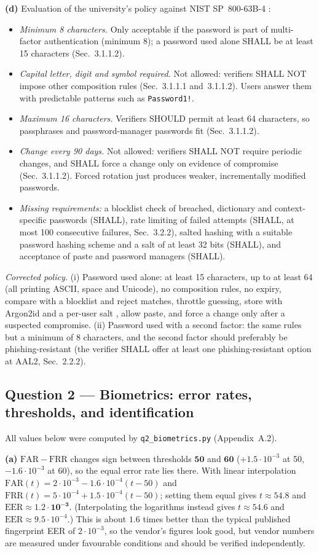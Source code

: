 \documentclass[11pt,a4paper]{article}
\begin{document}
\textbf{(d)} Evaluation of the university's policy against NIST SP~800-63B-4 \cite{nist63b4}:
\begin{itemize}
\item \emph{Minimum 8 characters.} Only acceptable if the password is part of multi-factor authentication
(minimum 8); a password used alone SHALL be at least 15 characters (Sec.~3.1.1.2).
\item \emph{Capital letter, digit and symbol required.} Not allowed: verifiers SHALL NOT impose other
composition rules (Sec.~3.1.1.1 and~3.1.1.2). Users answer them with predictable patterns such as
\texttt{Password1!}.
\item \emph{Maximum 16 characters.} Verifiers SHOULD permit at least 64 characters, so passphrases and
password-manager passwords fit (Sec.~3.1.1.2).
\item \emph{Change every 90 days.} Not allowed: verifiers SHALL NOT require periodic changes, and SHALL force a change
only on evidence of compromise (Sec.~3.1.1.2). Forced rotation just produces weaker, incrementally modified
passwords.
\item \emph{Missing requirements:} a blocklist check of breached, dictionary and context-specific passwords
(SHALL), rate limiting of failed attempts (SHALL, at most 100 consecutive failures, Sec.~3.2.2), salted
hashing with a suitable password hashing scheme and a salt of at least 32 bits (SHALL), and acceptance of paste and
password managers (SHALL).
\end{itemize}
\emph{Corrected policy.} (i) Password used alone: at least 15 characters, up to at least 64 (all printing ASCII,
space and Unicode), no composition rules, no expiry, compare with a blocklist and reject matches, throttle
guessing, store with Argon2id and a per-user salt \cite{owasp}, allow paste, and force a change only after
a suspected compromise. (ii) Password used with a second factor: the same rules but a minimum of 8
characters, and the second factor should preferably be phishing-resistant (the verifier SHALL offer at least
one phishing-resistant option at AAL2, Sec.~2.2.2).

\subsection*{Question 2 --- Biometrics: error rates, thresholds, and identification}
All values below were computed by \texttt{q2\_biometrics.py} (Appendix~A.2).

\textbf{(a)} $\mathrm{FAR}-\mathrm{FRR}$ changes sign between thresholds $\mathbf{50}$ and $\mathbf{60}$
($+1.5\cdot10^{-3}$ at 50, $-1.6\cdot10^{-3}$ at 60), so the equal error rate lies there. With linear
interpolation $\mathrm{FAR}(t)=2\cdot10^{-3}-1.6\cdot10^{-4}(t-50)$ and
$\mathrm{FRR}(t)=5\cdot10^{-4}+1.5\cdot10^{-4}(t-50)$; setting them equal gives $t\approx 54.8$ and
$\mathrm{EER}\approx \mathbf{1.2\cdot 10^{-3}}$. (Interpolating the logarithms instead gives $t\approx 54.6$ and
$\mathrm{EER}\approx 9.5\cdot 10^{-4}$.) This is about $1.6$ times better than the typical published fingerprint
EER of $2\cdot10^{-3}$, so the vendor's figures look good, but vendor numbers are measured under favourable
conditions and should be verified independently.
\end{document}
